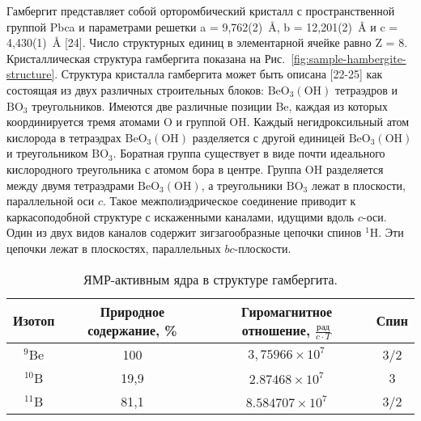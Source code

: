 Гамбергит представляет собой орторомбический кристалл с пространственной группой Pbca
и параметрами решетки a = 9,762(2)~\r{A}, b = 12,201(2)~\r{A} и c = 4,430(1)~\r{A} [24].
Число структурных единиц в элементарной ячейке равно Z = 8.
Кристаллическая структура гамбергита показана на Рис.~\ref{fig:sample-hambergite-structure}.
Структура кристалла гамбергита может быть описана [22-25] как состоящая из двух различных строительных блоков:
$\mathrm{BeO}_3(\mathrm{OH})$ тетраэдров
и $\mathrm{BO}_3$ треугольников.
Имеются две различные позиции Be,
каждая из которых координируется тремя атомами O и группой OH.
Каждый негидроксильный атом кислорода в тетраэдрах $\mathrm{BeO}_3(\mathrm{OH})$
разделяется с другой единицей $\mathrm{BeO}_3(\mathrm{OH})$
и треугольником $\mathrm{BO}_3$.
Боратная группа существует в виде почти идеального кислородного треугольника с атомом бора в центре.
Группа OH разделяется между двумя тетраэдрами $\mathrm{BeO}_3(\mathrm{OH})$,
а треугольники $\mathrm{BO}_3$ лежат в плоскости, параллельной оси $c$.
Такое межполиэдрическое соединение приводит к каркасоподобной структуре с искаженными каналами,
идущими вдоль $c$-оси.
Один из двух видов каналов содержит зигзагообразные цепочки спинов $^1$H.
Эти цепочки лежат в плоскостях, параллельных $bc$-плоскости.

\begin{table}[h]
  \centering
  \begin{tabular}{|c|c|c|c|}
    \hline
    Изотоп & Природное содержание, \% & Гиромагнитное отношение, $\frac{\mbox{рад}}{c \cdot T}$ & Спин \\ %
    \hline\hline
    $^9$Be & 100 & $3,75966 \times 10^7$ & 3/2 \\
    \hline
    $^{10}$B & 19,9 & $2.87468 \times 10^7$ & 3 \\
    \hline
    $^{11}$B & 81,1 & $8.584707 \times 10^7$ & 3/2 \\
    \hline
  \end{tabular}
  \caption{
    ЯМР-активным ядра в структуре гамбергита.
   }
  \label{tab:hambergite-isotopes}
\end{table}

